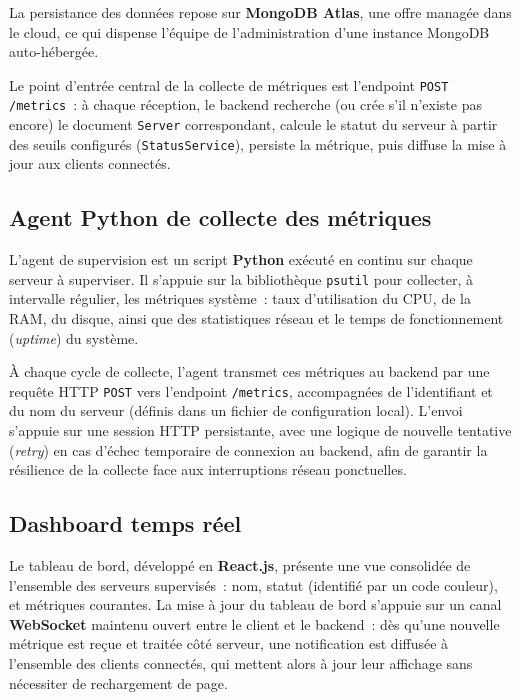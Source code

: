 La persistance des données repose sur \textbf{MongoDB Atlas}, une offre managée dans le cloud, ce qui dispense l'équipe de l'administration d'une instance MongoDB auto-hébergée.

Le point d'entrée central de la collecte de métriques est l'endpoint \texttt{POST /metrics}~: à chaque réception, le backend recherche (ou crée s'il n'existe pas encore) le document \texttt{Server} correspondant, calcule le statut du serveur à partir des seuils configurés (\texttt{StatusService}), persiste la métrique, puis diffuse la mise à jour aux clients connectés.

\subsection{Agent Python de collecte des métriques}

L'agent de supervision est un script \textbf{Python} exécuté en continu sur chaque serveur à superviser. Il s'appuie sur la bibliothèque \texttt{psutil} pour collecter, à intervalle régulier, les métriques système~: taux d'utilisation du CPU, de la RAM, du disque, ainsi que des statistiques réseau et le temps de fonctionnement (\emph{uptime}) du système.

À chaque cycle de collecte, l'agent transmet ces métriques au backend par une requête HTTP \texttt{POST} vers l'endpoint \texttt{/metrics}, accompagnées de l'identifiant et du nom du serveur (définis dans un fichier de configuration local). L'envoi s'appuie sur une session HTTP persistante, avec une logique de nouvelle tentative (\emph{retry}) en cas d'échec temporaire de connexion au backend, afin de garantir la résilience de la collecte face aux interruptions réseau ponctuelles.

\subsection{Dashboard temps réel}

Le tableau de bord, développé en \textbf{React.js}, présente une vue consolidée de l'ensemble des serveurs supervisés~: nom, statut (identifié par un code couleur), et métriques courantes. La mise à jour du tableau de bord s'appuie sur un canal \textbf{WebSocket} maintenu ouvert entre le client et le backend~: dès qu'une nouvelle métrique est reçue et traitée côté serveur, une notification est diffusée à l'ensemble des clients connectés, qui mettent alors à jour leur affichage sans nécessiter de rechargement de page.

